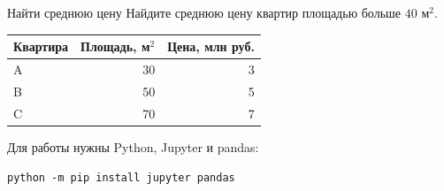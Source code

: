 \begin{frame}{Найти среднюю цену}
  Найдите среднюю цену квартир площадью больше $40$ м$^2$.
  \medskip\par
  \begin{tabularx}{\linewidth}{@{}Y r r@{}}
    \toprule
    \textbf{Квартира} & \textbf{Площадь, м$^2$} & \textbf{Цена, млн руб.}\\
    \midrule
    A & 30 & 3\\
    B & 50 & 5\\
    C & 70 & 7\\
    \bottomrule
  \end{tabularx}
  \medskip\par
  Для работы нужны Python, Jupyter и pandas:
  \par\texttt{python -m pip install jupyter pandas}
\end{frame}
